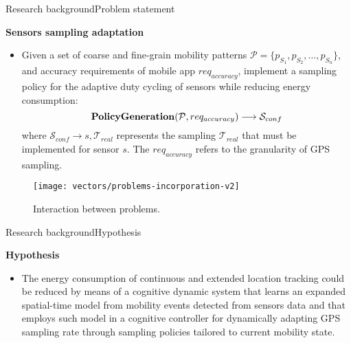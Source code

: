 \begin{frame}{Research background}{Problem statement}
\small

\begin{exampleblock}{\small \textbf{Sensors sampling adaptation}}
\begin{itemize}
\item Given a set of coarse and fine-grain mobility patterns $\mathcal{P} = \{ p_{S_1}, p_{S_2}, \ldots, p_{S_n} \}$, and accuracy requirements of mobile app $req_{accuracy}$, implement a sampling policy for the adaptive duty cycling of sensors while reducing energy consumption:
\begin{equation*}
  \text{\textbf{PolicyGeneration}}( \mathcal{P}, req_{accuracy}) \longrightarrow{} \mathcal{S}_{conf}
\end{equation*}
where $\mathcal{S}_{conf} \rightarrow s, \mathcal{T}_{real}$ represents the sampling $\mathcal{T}_{real}$ that must be implemented for sensor $s$.
The $req_{accuracy}$ refers to the granularity of GPS sampling.
\end{itemize}
\end{exampleblock}

\begin{figure}[tb]
  \centering
  \texttt{[image: vectors/problems-incorporation-v2]}
  \caption{Interaction between problems.}
\end{figure}
\end{frame}

\begin{frame}{Research background}{Hypothesis}
\small
\begin{block}{\small \textbf{Hypothesis}}
\renewcommand{\baselinestretch}{1.4}
\begin{itemize}
  \item The energy consumption of continuous and extended location tracking could be reduced by means of a cognitive dynamic system that learns an expanded spatial-time model from mobility events detected from sensors data and that employs such model in a cognitive controller for dynamically adapting GPS sampling rate through sampling policies tailored to current mobility state.
\end{itemize}
\end{block}
\end{frame}


